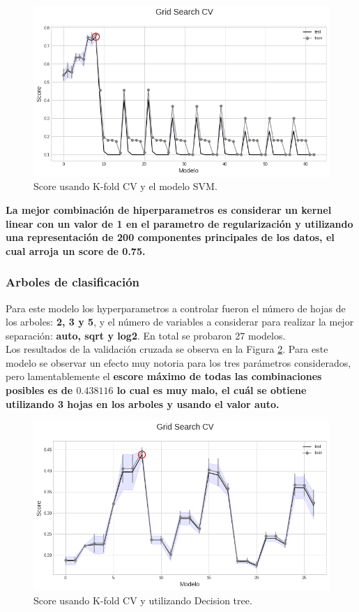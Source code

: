 \documentclass[paper=letter, fontsize=11pt]{scrartcl}
\numberwithin{equation}{section} %
\numberwithin{figure}{section} %
\numberwithin{table}{section} %
\begin{document}
\begin{figure}[H] 
\centering
\includegraphics[scale=0.4]{figure/SVM.png}\caption{Score usando K-fold CV y el modelo SVM.}\label{svm}
\end{figure}

\textbf{La mejor combinación de hiperparametros es considerar un kernel linear con un valor de 1 en el parametro de regularización y utilizando una representación de 200 componentes principales de los datos, el cual arroja un score de 0.75.} 


\subsubsection*{Arboles de clasificación}
Para este modelo los hyperparametros a controlar fueron el número de hojas de los arboles: \textbf{2, 3 y 5},  y el número de variables a considerar para realizar la mejor separación: \textbf{auto, sqrt y log2}. En total se probaron 27 modelos.\\

Los resultados de la validación cruzada se observa en la Figura \ref{tree}. Para este modelo se observar un efecto muy notoria para los tres parámetros considerados, pero lamentablemente el \textbf{escore máximo de todas las combinaciones posibles es de $0.438116$ lo cual es muy malo, el cuál se obtiene utilizando 3 hojas en los arboles y usando el valor auto.}

\begin{figure}[H] 
\centering
\includegraphics[scale=0.5]{figure/tree.png}\caption{Score usando K-fold CV y utilizando Decision tree.}\label{tree}
\end{figure}
\end{document}
